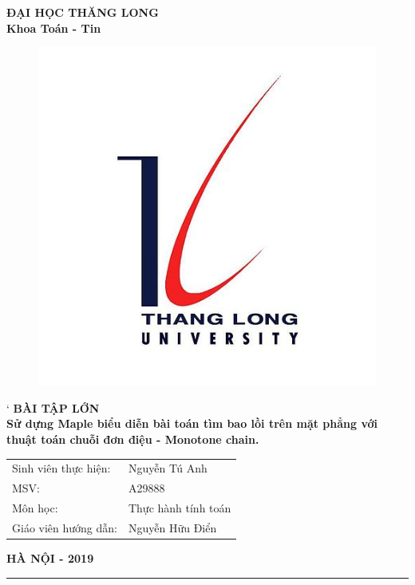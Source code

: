 %
\begin{titlepage}
    \begin{center}
        {\bfseries ĐẠI HỌC THĂNG LONG\\Khoa Toán - Tin}
    \end{center}
    \vspace*{1cm}
    \begin{figure}[!ht]
        \centering
        \includegraphics[scale = 0.4]{Image/LogoTLU}
    \end{figure}
    \vspace*{1cm}
    \begin{center}
`       {\Large \bfseries BÀI TẬP LỚN\\}
        \vspace*{1cm}
        {\huge \bfseries  Sử dựng Maple biểu diễn bài toán tìm bao lồi trên mặt phẳng với thuật toán chuỗi đơn điệu - Monotone chain.}
    \end{center}
    \vspace*{1cm}
    \begin{flushright}
        \parbox[l]{8cm}{
            \bfseries
            \begin{tabular}{ l  l }
                Sinh viên thực hiện:& Nguyễn Tú Anh \\
                MSV:& A29888  \\
                Môn học:& Thực hành tính toán\\
                Giáo viên hướng dẫn:& Nguyễn Hữu Điển \\
            \end{tabular}
        }
    \end{flushright}
    \vfill
    \centerline{\bf HÀ NỘI - 2019}
\end{titlepage}
\vfill
\hrule
\thispagestyle{empty}